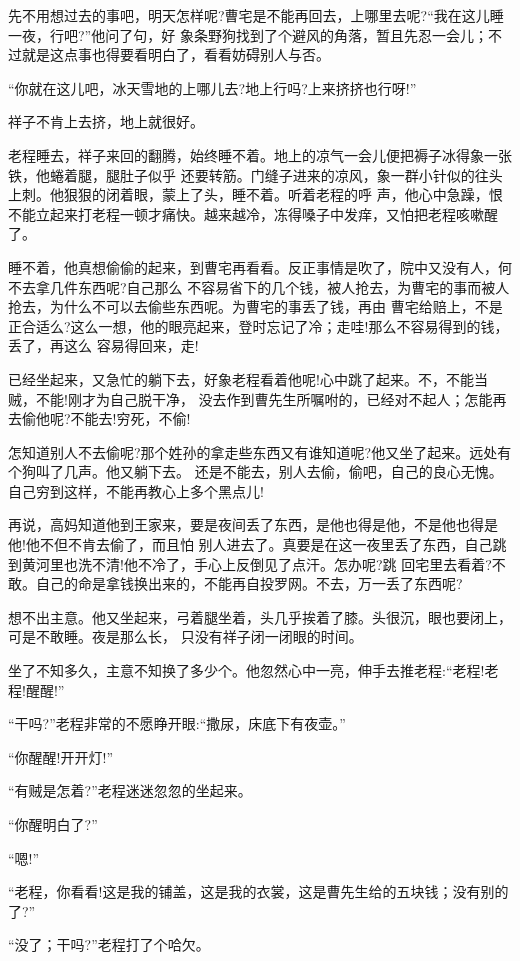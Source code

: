 \documentclass[11pt,a4paper,onecolumn]{article}
\begin{document}
先不用想过去的事吧，明天怎样呢?曹宅是不能再回去，上哪里去呢?``我在这儿睡一夜，行吧?''他问了句，好
象条野狗找到了个避风的角落，暂且先忍一会儿；不过就是这点事也得要看明白了，看看妨碍别人与否。

``你就在这儿吧，冰天雪地的上哪儿去?地上行吗?上来挤挤也行呀!''

祥子不肯上去挤，地上就很好。

老程睡去，祥子来回的翻腾，始终睡不着。地上的凉气一会儿便把褥子冰得象一张铁，他蜷着腿，腿肚子似乎
还要转筋。门缝子进来的凉风，象一群小针似的往头上刺。他狠狠的闭着眼，蒙上了头，睡不着。听着老程的呼
声，他心中急躁，恨不能立起来打老程一顿才痛快。越来越冷，冻得嗓子中发痒，又怕把老程咳嗽醒了。

睡不着，他真想偷偷的起来，到曹宅再看看。反正事情是吹了，院中又没有人，何不去拿几件东西呢?自己那么
不容易省下的几个钱，被人抢去，为曹宅的事而被人抢去，为什么不可以去偷些东西呢。为曹宅的事丢了钱，再由
曹宅给赔上，不是正合适么?这么一想，他的眼亮起来，登时忘记了冷；走哇!那么不容易得到的钱，丢了，再这么
容易得回来，走!

已经坐起来，又急忙的躺下去，好象老程看着他呢!心中跳了起来。不，不能当贼，不能!刚才为自己脱干净，
没去作到曹先生所嘱咐的，已经对不起人；怎能再去偷他呢?不能去!穷死，不偷!

怎知道别人不去偷呢?那个姓孙的拿走些东西又有谁知道呢?他又坐了起来。远处有个狗叫了几声。他又躺下去。
还是不能去，别人去偷，偷吧，自己的良心无愧。自己穷到这样，不能再教心上多个黑点儿!

再说，高妈知道他到王家来，要是夜间丢了东西，是他也得是他，不是他也得是他!他不但不肯去偷了，而且怕
别人进去了。真要是在这一夜里丢了东西，自己跳到黄河里也洗不清!他不冷了，手心上反倒见了点汗。怎办呢?跳
回宅里去看着?不敢。自己的命是拿钱换出来的，不能再自投罗网。不去，万一丢了东西呢?

想不出主意。他又坐起来，弓着腿坐着，头几乎挨着了膝。头很沉，眼也要闭上，可是不敢睡。夜是那么长，
只没有祥子闭一闭眼的时间。

坐了不知多久，主意不知换了多少个。他忽然心中一亮，伸手去推老程:``老程!老程!醒醒!''

``干吗?''老程非常的不愿睁开眼:``撒尿，床底下有夜壶。''

``你醒醒!开开灯!''

``有贼是怎着?''老程迷迷忽忽的坐起来。

``你醒明白了?''

``嗯!''

``老程，你看看!这是我的铺盖，这是我的衣裳，这是曹先生给的五块钱；没有别的了?''

``没了；干吗?''老程打了个哈欠。
\end{document}
